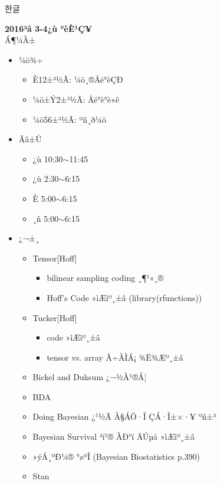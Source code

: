 \documentclass[11pt]{article}
\newenvironment{Korean}{\CJKfamily{mj}}{}
\begin{document}
\begin{CJK}{UTF8}{}

\begin{Korean}
한글
\end{Korean}
\end{CJK}
\begin{center}
{\large\bf 2016³â 3-4¿ù °èÈ¹Ç¥\\}
Á¶¼­À±
\end{center}

\begin{itemize}
\item ¼ö¾÷
	\begin{itemize}
	\item È­12±³½Ã: ¼ö¸®Åë°èÇÐ
	\item ¼ö±Ý2±³½Ã: Åë°è°è»ê
	\item ¼ö56±³½Ã: ºñ¸ð¼ö
	\end{itemize}
\item Ãâ±Ù
	\begin{itemize}
	\item ¿ù 10:30$\sim$11:45
	\item ¿ù 2:30$\sim$6:15
	\item È­ 5:00$\sim$6:15
	\item ¸ñ 5:00$\sim$6:15
	\end{itemize}
\item ¿¬±¸
	\begin{itemize}
	\item Tensor[Hoff]
		\begin{itemize}
		\item bilinear sampling coding ¸¶¹«¸®
		\item Hoff's Code »ìÆìº¸±â ({\color{blue}library(rfunctions)})
		\end{itemize}
	\item Tucker[Hoff]
		\begin{itemize}
		\item code »ìÆìº¸±â
		\item tensor vs. array Â÷ÀÌÁ¡ ¾Ë¾Æº¸±â
		\end{itemize}
	\item Bickel and Duksum ¿¬½À¹®Á¦
	\item BDA
	\item Doing Bayesian ¿¹½Ã À§ÁÖ·Î ÇÁ·Î±×·¥ ºñ±³
	\item Bayesian Survival ³í¹® ÀÐ°í ÄÚµå »ìÆìº¸±â 
	\item »ýÁ¸ºÐ¼® °øºÎ (Bayesian Biostatistics p.390)
	\item Stan
	\end{itemize}
\end{itemize}
\end{document}
